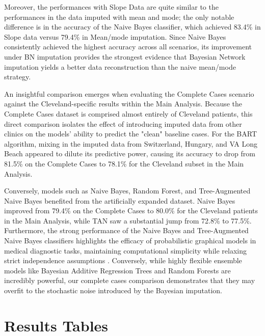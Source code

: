 \documentclass[11pt, a4paper]{article}
\begin{document}
	Moreover, the performances with Slope Data are quite similar to the performances in the data imputed with mean and mode; the only notable difference is in the accuracy of the Naive Bayes classifier, which achieved 83.4\% in Slope data versus 79.4\% in Mean/mode imputation. Since Naive Bayes consistently achieved the highest accuracy across all scenarios, its improvement under BN imputation provides the strongest evidence that Bayesian Network imputation yields a better data reconstruction than the naive mean/mode strategy.
	
	An insightful comparison emerges when evaluating the Complete Cases scenario against the Cleveland-specific results within the Main Analysis. Because the Complete Cases dataset is comprised almost entirely of Cleveland patients, this direct comparison isolates the effect of introducing imputed data from other clinics on the models' ability to predict the "clean" baseline cases. For the BART algorithm, mixing in the imputed data from Switzerland, Hungary, and VA Long Beach appeared to dilute its predictive power, causing its accuracy to drop from 81.5\% on the Complete Cases to 78.1\% for the Cleveland subset in the Main Analysis. 
	
	Conversely, models such as Naive Bayes, Random Forest, and Tree-Augmented Naive Bayes benefited from the artificially expanded dataset. Naive Bayes improved from 79.4\% on the Complete Cases to 80.0\% for the Cleveland patients in the Main Analysis, while TAN saw a substantial jump from 72.8\% to 77.5\%. Furthermore, the strong performance of the Naive Bayes and Tree-Augmented Naive Bayes classifiers highlights the efficacy of probabilistic graphical models in medical diagnostic tasks, maintaining computational simplicity while relaxing strict independence assumptions \cite{nagarajan2013bayesian}. Conversely, while highly flexible ensemble models like Bayesian Additive Regression Trees and Random Forests \cite{james2013introduction} \cite{hastie2009elements} are incredibly powerful, our complete cases comparison demonstrates that they may overfit to the stochastic noise introduced by the Bayesian imputation.
	
	\newpage
	\section*{Results Tables}
	
\end{document}
